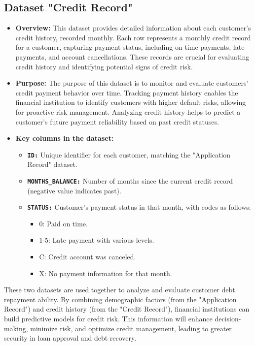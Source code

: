 \documentclass[12pt]{report}
\begin{document}
    \subsection{Dataset "Credit Record"}
    \begin{itemize}
        \item {\bfseries Overview:} This dataset provides detailed information about each customer’s credit history, recorded monthly. Each row represents a monthly credit record for a customer, capturing payment status, including on-time payments, late payments, and account cancellations. These records are crucial for evaluating credit history and identifying potential signs of credit risk.
        \item {\bfseries Purpose:} The purpose of this dataset is to monitor and evaluate customers’ credit payment behavior over time. Tracking payment history enables the financial institution to identify customers with higher default risks, allowing for proactive risk management. Analyzing credit history helps to predict a customer’s future payment reliability based on past credit statuses.
        \item {\bfseries Key columns in the dataset:}
        \begin{itemize}
            \item {\bfseries \texttt{ID:}} Unique identifier for each customer, matching the "Application Record" dataset.
            \item {\bfseries \texttt{MONTHS\_BALANCE:}} Number of months since the current credit record (negative value indicates past).
            \item {\bfseries \texttt{STATUS:}} Customer’s payment status in that month, with codes as follows:
            \begin{itemize}
                \item 0: Paid on time.
                \item 1-5: Late payment with various levels.
                \item C: Credit account was canceled.
                \item X: No payment information for that month.
            \end{itemize}
        \end{itemize}
    \end{itemize}

    These two datasets are used together to analyze and evaluate customer debt repayment ability. By combining demographic factors (from the "Application Record") and credit history (from the "Credit Record"), financial institutions can build predictive models for credit risk. This information will enhance decision-making, minimize risk, and optimize credit management, leading to greater security in loan approval and debt recovery.
\end{document}
